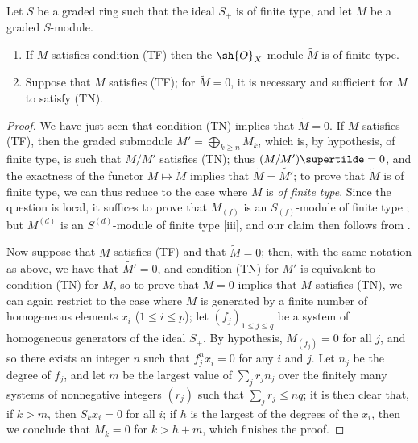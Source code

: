 \begin{proposition}[2.7.3]
\label{II.2.7.3}
Let $S$ be a graded ring such that the ideal $S_+$ is of finite type, and let $M$ be a graded $S$-module.
\begin{enumerate}
  \item[{\rm(i)}] If $M$ satisfies condition (TF) then the $\sh{O}_X$-module $\widetilde{M}$ is of finite type.
  \item[{\rm(ii)}] Suppose that $M$ satisfies (TF);
    for $\widetilde{M}=0$, it is necessary and sufficient for $M$ to satisfy (TN).
\end{enumerate}
\end{proposition}

\begin{proof}
We have just seen that condition (TN) implies that $\widetilde{M}=0$.
If $M$ satisfies (TF), then the graded submodule $M'=\bigoplus_{k\geq n}M_k$, which is, by hypothesis, of finite type, is such that $M/M'$ satisfies (TN);
thus $(M/M')\supertilde=0$, and the exactness of the functor $M\mapsto\widetilde{M}$  implies that $\widetilde{M}=\widetilde{M'}$;
to prove that $\widetilde{M}$ is of finite type, we can thus reduce to the case where $M$ is \emph{of finite type}.
Since the question is local, it suffices to prove that $M_{(f)}$ is an $S_{(f)}$-module of finite type ;
but $M^{(d)}$ is an $S^{(d)}$-module of finite type [iii], and our claim then follows from .

Now suppose that $M$ satisfies (TF) and that $\widetilde{M}=0$;
then, with the same notation as above, we have that $\widetilde{M'}=0$, and condition (TN) for $M'$ is equivalent to condition (TN) for $M$, so to prove that $\widetilde{M}=0$ implies that $M$ satisfies (TN), we can again restrict to the case where $M$ is generated by a finite number of homogeneous elements $x_i$ ($1\leq i\leq p$);
let $(f_j)_{1\leq j\leq q}$ be a system of homogeneous generators of the ideal $S_+$.
By hypothesis, $M_{(f_j)}=0$ for all $j$, and so there exists an integer $n$ such that $f_j^nx_i=0$ for any $i$ and $j$.
Let $n_j$ be the degree of $f_j$, and let $m$ be the largest value of $\sum_j r_jn_j$ over the finitely many systems of nonnegative integers $(r_j)$ such that $\sum_j r_j\leq nq$;
it is then clear
that, if $k>m$, then $S_kx_i=0$ for all $i$;
if $h$ is the largest of the degrees of the $x_i$, then we conclude that $M_k=0$ for $k>h+m$, which finishes the proof.
\end{proof}

